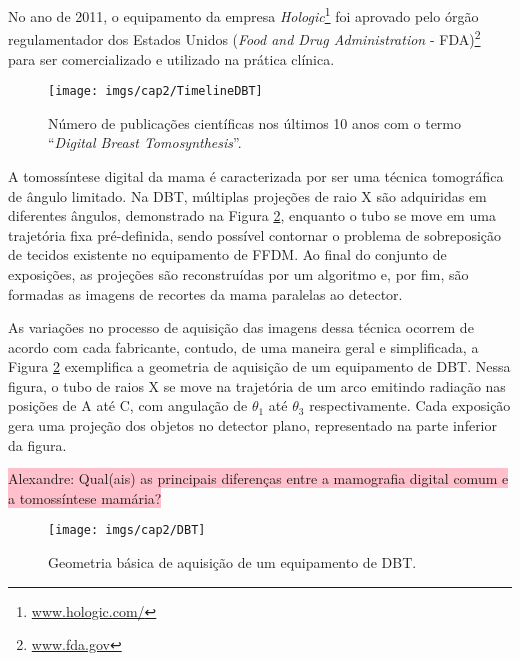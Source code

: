 No ano de 2011, o equipamento da empresa \textit{Hologic}\footnote{\url{www.hologic.com/}} foi aprovado pelo órgão regulamentador dos Estados Unidos (\textit{Food and Drug Administration} - \acs{FDA})\footnote{\url{www.fda.gov}} para ser comercializado e utilizado na prática clínica.  
    
 
\begin{figure}[H]
	\caption{Número de publicações científicas nos últimos 10 anos com o termo ``\textit{Digital Breast Tomosynthesis}''.}
	\begin{center}
		\texttt{[image: imgs/cap2/TimelineDBT]}
	\end{center}
	\label{fig:imgCap2TimelineDBT}
\end{figure}

A tomossíntese digital da mama é caracterizada por ser uma técnica tomográfica de ângulo limitado. Na \acs{DBT}, múltiplas projeções de raio X são adquiridas em diferentes ângulos, demonstrado na Figura \ref{fig:imgCap2DBTEstrutura}, enquanto o tubo se move em uma trajetória fixa pré-definida, sendo possível contornar o problema de sobreposição de tecidos existente no equipamento de \acs{FFDM}. Ao final do conjunto de exposições, as projeções são reconstruídas por um algoritmo e, por fim, são formadas as imagens de recortes da mama paralelas ao detector. 

As variações no processo de aquisição das imagens dessa técnica ocorrem de acordo com cada fabricante, contudo, de uma maneira geral e simplificada, a Figura \ref{fig:imgCap2DBTEstrutura} exemplifica a geometria de aquisição de um equipamento de \acs{DBT}. Nessa figura, o tubo de raios X se move na trajetória de um arco emitindo radiação nas posições de A até C, com angulação de $\theta_{1}$ até $\theta_{3}$ respectivamente. Cada exposição gera uma projeção dos objetos no detector plano, representado na parte inferior da figura.

\colorbox{pink}{Alexandre: Qual(ais) as principais diferenças entre a mamografia digital comum e a tomossíntese mamária?}
 
\begin{figure}[H]
	\caption{Geometria básica de aquisição de um equipamento de \acs{DBT}.}
	\begin{center}
		\texttt{[image: imgs/cap2/DBT]}
	\end{center}
	\label{fig:imgCap2DBTEstrutura}
\end{figure}


